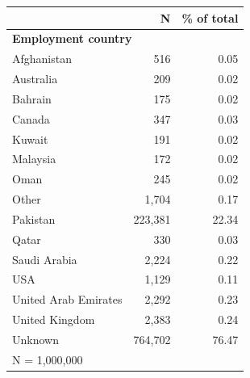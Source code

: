 \begin{tabular}{lrr}


\toprule


 & N & \% of total \\


\midrule


\multicolumn{3}{l}{\textbf{Employment country}}\\ 
\midrule
Afghanistan         &         516&        0.05\\
Australia           &         209&        0.02\\
Bahrain             &         175&        0.02\\
Canada              &         347&        0.03\\
Kuwait              &         191&        0.02\\
Malaysia            &         172&        0.02\\
Oman                &         245&        0.02\\
Other               &       1,704&        0.17\\
Pakistan            &     223,381&       22.34\\
Qatar               &         330&        0.03\\
Saudi Arabia        &       2,224&        0.22\\
USA                 &       1,129&        0.11\\
United Arab Emirates&       2,292&        0.23\\
United Kingdom      &       2,383&        0.24\\
Unknown             &     764,702&       76.47\\
\midrule


\multicolumn{3}{l}{\footnotesize N =    1,000,000}\\


\bottomrule


\end{tabular}


